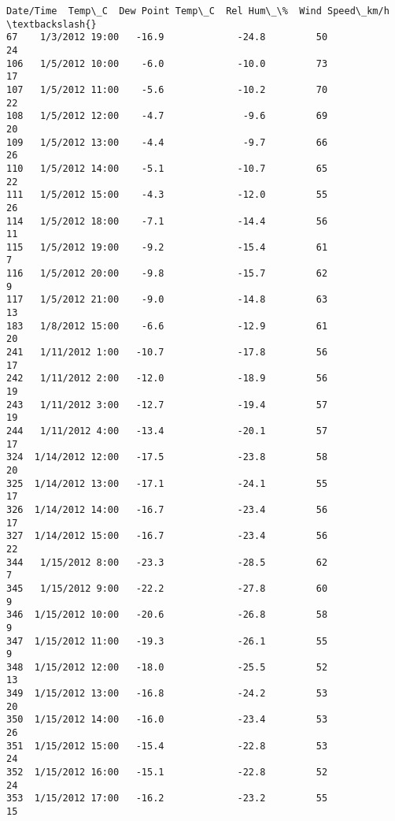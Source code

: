 \documentclass[11pt]{article}
\makeatletter
\newcommand{\boxspacing}{\kern\kvtcb@left@rule\kern\kvtcb@boxsep}
\newcommand{\prompt}[4]{
        {\ttfamily\llap{{\color{#2}[#3]:\hspace{3pt}#4}}\vspace{-\baselineskip}}
    }
\makeatother
\begin{document}
            \begin{tcolorbox}[breakable, size=fbox, boxrule=.5pt, pad at break*=1mm, opacityfill=0]
\prompt{Out}{outcolor}{88}{\boxspacing}
\begin{Verbatim}[commandchars=\\\{\}]
           Date/Time  Temp\_C  Dew Point Temp\_C  Rel Hum\_\%  Wind Speed\_km/h  \textbackslash{}
67    1/3/2012 19:00   -16.9             -24.8         50               24
106   1/5/2012 10:00    -6.0             -10.0         73               17
107   1/5/2012 11:00    -5.6             -10.2         70               22
108   1/5/2012 12:00    -4.7              -9.6         69               20
109   1/5/2012 13:00    -4.4              -9.7         66               26
110   1/5/2012 14:00    -5.1             -10.7         65               22
111   1/5/2012 15:00    -4.3             -12.0         55               26
114   1/5/2012 18:00    -7.1             -14.4         56               11
115   1/5/2012 19:00    -9.2             -15.4         61                7
116   1/5/2012 20:00    -9.8             -15.7         62                9
117   1/5/2012 21:00    -9.0             -14.8         63               13
183   1/8/2012 15:00    -6.6             -12.9         61               20
241   1/11/2012 1:00   -10.7             -17.8         56               17
242   1/11/2012 2:00   -12.0             -18.9         56               19
243   1/11/2012 3:00   -12.7             -19.4         57               19
244   1/11/2012 4:00   -13.4             -20.1         57               17
324  1/14/2012 12:00   -17.5             -23.8         58               20
325  1/14/2012 13:00   -17.1             -24.1         55               17
326  1/14/2012 14:00   -16.7             -23.4         56               17
327  1/14/2012 15:00   -16.7             -23.4         56               22
344   1/15/2012 8:00   -23.3             -28.5         62                7
345   1/15/2012 9:00   -22.2             -27.8         60                9
346  1/15/2012 10:00   -20.6             -26.8         58                9
347  1/15/2012 11:00   -19.3             -26.1         55                9
348  1/15/2012 12:00   -18.0             -25.5         52               13
349  1/15/2012 13:00   -16.8             -24.2         53               20
350  1/15/2012 14:00   -16.0             -23.4         53               26
351  1/15/2012 15:00   -15.4             -22.8         53               24
352  1/15/2012 16:00   -15.1             -22.8         52               24
353  1/15/2012 17:00   -16.2             -23.2         55               15

\end{Verbatim}
\end{tcolorbox}
\end{document}
